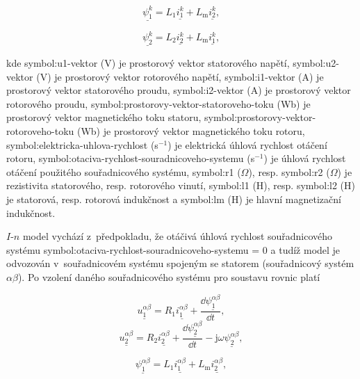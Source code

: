 \documentclass[a4paper, twoside, 11pt]{article}
\begin{document}
		\begin{equation}
			\underline{\psi_1^{k}} = L_1 \underline{i_1^{k}} + L_\text{m} \underline{i_2^{k}},
		\end{equation}
	
		\begin{equation}
			\underline{\psi_2^{k}} = L_2 \underline{i_2^{k}} + L_\text{m} \underline{i_1^{k}},
		\end{equation}

		kde \gls{symbol:u1-vektor} (V) je prostorový vektor statorového napětí, \gls{symbol:u2-vektor} (V) je prostorový vektor rotorového napětí, \gls{symbol:i1-vektor} (A) je prostorový vektor statorového proudu, \gls{symbol:i2-vektor} (A) je prostorový vektor rotorového proudu, \gls{symbol:prostorovy-vektor-statoroveho-toku} (Wb) je prostorový vektor magnetického toku statoru, \gls{symbol:prostorovy-vektor-rotoroveho-toku} (Wb) je prostorový vektor magnetického toku rotoru, \gls{symbol:elektricka-uhlova-rychlost} (s$^{-1}$) je elektrická úhlová rychlost otáčení rotoru, \gls{symbol:otaciva-rychlost-souradnicoveho-systemu} (s$^{-1}$) je úhlová rychlost otáčení použitého souřadnicového systému, \gls{symbol:r1} ($\Omega$), resp. \gls{symbol:r2} ($\Omega$) je rezistivita statorového, resp. rotorového vinutí, \gls{symbol:l1} (H), resp. \gls{symbol:l2} (H) je statorová, resp. rotorová indukčnost a \gls{symbol:lm} (H) je hlavní magnetizační indukčnost.\par
		$I$-$n$ model vychází z~předpokladu, že otáčivá úhlová rychlost souřadnicového systému \gls{symbol:otaciva-rychlost-souradnicoveho-systemu} = 0 a tudíž model je odvozován v~souřadnicovém systému spojeným se statorem (souřadnicový systém $\alpha \beta$). Po vzolení daného souřadnicového systému pro soustavu rovnic platí

		\begin{equation}
			\underline{u_{1}^{\alpha \beta}} = R_1 \underline{i_{1}^{\alpha \beta}} + \frac{\dd{\underline{\psi_1^{\alpha \beta}}}}{\dd{t}},
		\end{equation}
		\begin{equation}\label{eq:alphabeta-napeti-rotor-rovnice-i-n-model}
			\underline{u_{2}^{\alpha \beta}} = R_2 \underline{i_{2}^{\alpha \beta}} + \frac{\dd{\underline{\psi_2^{\alpha \beta}}}}{\dd{t}} - \text{j} \omega \underline{\psi_2^{\alpha \beta}},
		\end{equation}
	
		\begin{equation}
			\underline{\psi_1^{\alpha \beta}} = L_1 \underline{i_1^{\alpha \beta}} + L_\text{m} \underline{i_2^{\alpha \beta}},
		\end{equation}
	
\end{document}
